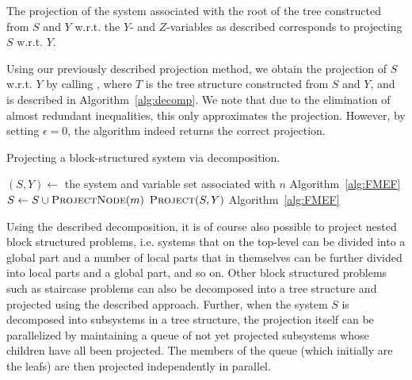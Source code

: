 \documentclass{llncs}
\begin{document}
\begin{proposition}
The projection of the system associated with the root of the tree constructed from $S$ and $Y$ w.r.t. the $Y$- and $Z$-variables as described corresponds to projecting $S$ w.r.t. $Y$.
\end{proposition}

Using our previously described projection method, we obtain the projection of $S$ w.r.t. $Y$ by calling , where $T$ is the tree structure constructed from $S$ and $Y$, and  is described in Algorithm~\ref{alg:decomp}. We note that due to the elimination of almost redundant inequalities, this only
approximates the projection. However, by setting $\epsilon = 0$, the algorithm indeed returns the correct projection.

\begin{algorithm}[t]
\caption{{Projecting a block-structured system via decomposition.}}
\label{alg:decomp}
\begin{algorithmic}
	\State $(S,Y)\gets$ the system and variable set associated with $n$
		\State \Return {}\Comment Algorithm~\ref{alg:FMEF}
	\Else
			\State $S \gets S\cup \Call{ProjectNode}{m}$ 
		\EndFor
		\State \Return $\Call{Project}{S, Y}$ \Comment Algorithm~\ref{alg:FMEF}
	\EndIf
\EndFunction
\end{algorithmic}
\end{algorithm}

Using the described decomposition, it is of course also possible to project nested block structured problems, i.e. systems that on the top-level can be divided into a global part and a number of local parts that in themselves can be further divided into local parts and a global part, and so on. Other block structured problems such as staircase problems can also be decomposed into a tree structure and projected using the described approach. 
%
Further, when the system $S$ is decomposed into subsystems in a tree structure, the projection itself can be parallelized by maintaining a queue of not yet projected subsystems whose children have all been projected. The members of the queue (which initially are the leafs) are then projected independently in parallel. 

\end{document}

